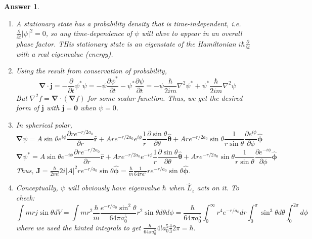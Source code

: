 \documentclass[a4paper]{article}
\newtheorem{ans}{Answer}[subsection]
\theoremstyle{new}
\begin{document}
\begin{ans}\leavevmode
\begin{enumerate}[label=(\roman*)]
\item A stationary state has a probability density that is time-independent, i.e. $\frac{\partial}{\partial t}|\psi|^2=0$, so any time-dependence of $\psi$ will ahve to appear in an overall phase factor. THis stationary state is an eigenstate of the Hamiltonian $i\hbar\frac{\partial}{\partial t}$ with a real eigenvalue (energy).
\item Using the result from conservation of probability,
$$\boldsymbol{\nabla}\cdot\mathbf{j}=-\frac{\partial}{\partial t}\psi^*\psi=-\psi\frac{\partial\psi^*}{\partial t}-\psi^*\frac{\partial\psi}{\partial t}=-\psi\frac{\hbar}{2im}\nabla^2\psi^*+\psi^*\frac{\hbar}{2im}\nabla^2\psi$$
But $\nabla^2f=\boldsymbol{\nabla}\cdot(\boldsymbol{\nabla}f)$ for some scalar function. Thus, we get the desired form of $\mathbf{j}$ with $\mathbf{j}=\boldsymbol{0}$ when $\psi=0$.
\item In spherical polar,
$$\boldsymbol{\nabla}\psi=A\sin\theta e^{i\phi}\frac{\partial re^{-r/2a_0}}{\partial r}\mathbf{\hat{r}}+Are^{-r/2a_0}e^{i\phi}\frac{1}{r}\frac{\partial\sin\theta}{\partial\theta}\boldsymbol{\hat{\theta}}+Are^{-r/2a_0}\sin\theta\frac{1}{r\sin\theta}\frac{\partial e^{i\phi}}{\partial\phi}\boldsymbol{\hat{\phi}}$$
$$\boldsymbol{\nabla}\psi^*=A\sin\theta e^{-i\phi}\frac{\partial re^{-r/2a_0}}{\partial r}\mathbf{\hat{r}}+Are^{-r/2a_0}e^{-i\phi}\frac{1}{r}\frac{\partial\sin\theta}{\partial\theta}\boldsymbol{\hat{\theta}}+Are^{-r/2a_0}\sin\theta\frac{1}{r\sin\theta}\frac{\partial e^{-i\phi}}{\partial\phi}\boldsymbol{\hat{\phi}}$$
Thus, $\mathbf{J}=\frac{\hbar}{2mi}2i|A|^2re^{-r/a_0}\sin\theta\boldsymbol{\hat{\phi}}=\frac{\hbar}{m}\frac{1}{64\pi a^5}re^{-r/a_0}\sin\theta\boldsymbol{\hat{\phi}}$.
\item Conceptually, $\psi$ will obviously have eigenvalue $\hbar$ when $\hat{L}_z$ acts on it. To check:
$$\int mrj\sin\theta dV=\int mr^2\frac{\hbar}{m}\frac{e^{-r/a_0}\sin^2\theta}{64\pi a_0^5}r^2\sin\theta d\theta d\phi=\frac{\hbar}{64\pi a_0^5}\int_0^\infty r^4e^{-r/a_0}dr\int_0^\pi\sin^3\theta d\theta\int_0^{2\pi}d\phi$$
where we used the hinted integrals to get $\frac{\hbar}{64\pi a_0^5}4!a_0^5\frac{4}{3}2\pi=\hbar$.
\end{enumerate}
\end{ans}
\end{document}
